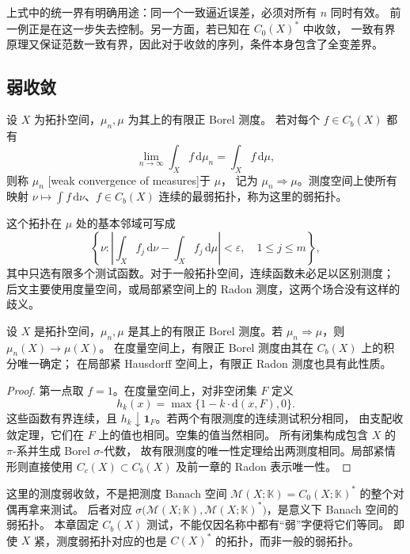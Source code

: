 上式中的统一界有明确用途：同一个一致逼近误差，必须对所有 \(n\) 同时有效。
前一例正是在这一步失去控制。另一方面，若已知在 \(C_0(X)^*\) 中\WeakStar{}收敛，
一致有界原理又保证范数一致有界，因此对于收敛的序列，\WeakStar{}条件本身包含了全变差界。

\subsection{弱收敛}
\label{b1:subsec:120103}

\begin{definition}\label{b1:def:measure-weak-convergence}
设 \(X\) 为拓扑空间，\(\mu_n,\mu\) 为其上的有限正 Borel 测度。
若对每个 \(f\in C_b(X)\) 都有
\[
 \lim_{n\to\infty}\int_X f\,\mathrm{d}\mu_n=\int_X f\,\mathrm{d}\mu,
\]
则称 \(\mu_n\) [weak convergence of measures]于 \(\mu\)，
记为 \(\mu_n\Rightarrow\mu\)。测度空间上使所有映射
\(\nu\mapsto\int f\,\mathrm{d}\nu\)、\(f\in C_b(X)\) 连续的最弱拓扑，称为这里的弱拓扑。
\end{definition}

这个拓扑在 \(\mu\) 处的基本邻域可写成
\[
 \left\{\nu:
 \left|\int_X f_j\,\mathrm{d}\nu-\int_X f_j\,\mathrm{d}\mu\right|<\varepsilon,
 \quad 1\leq j\leq m\right\},
\]
其中只选有限多个测试函数。对于一般拓扑空间，连续函数未必足以区别测度；
后文主要使用度量空间，或局部紧空间上的 Radon 测度，这两个场合没有这样的歧义。

\begin{proposition}\label{b1:prop:weak-mass-uniqueness}
设 \(X\) 是拓扑空间，\(\mu_n,\mu\) 是其上的有限正 Borel 测度。若 \(\mu_n\Rightarrow\mu\)，则 \(\mu_n(X)\to\mu(X)\)。
在度量空间上，有限正 Borel 测度由其在 \(C_b(X)\) 上的积分唯一确定；
在局部紧 Hausdorff 空间上，有限正 Radon 测度也具有此性质。
\end{proposition}
\begin{proof}
第一点取 \(f=1\)。在度量空间上，对非空闭集 \(F\) 定义
\[
 h_k(x)=\max\{1-k\cdot \mathrm{d}(x,F),0\}.
\]
这些函数有界连续，且 \(h_k\downarrow\mathbf1_F\)。若两个有限测度的连续测试积分相同，
由支配收敛定理，它们在 \(F\) 上的值也相同。空集的值当然相同。
所有闭集构成包含 \(X\) 的 \(\pi\)-系并生成 Borel \(\sigma\)-代数，
故有限测度的唯一性定理给出两测度相同。局部紧情形则直接使用
\(C_c(X)\subset C_b(X)\) 及前一章的 Radon 表示唯一性。
\end{proof}

这里的测度弱收敛，不是把测度 Banach 空间 \(\mathcal M(X;\mathbb K)=C_0(X;\mathbb K)^*\) 的整个对偶再拿来测试。
后者对应 \(\sigma\bigl(\mathcal M(X;\mathbb K),\mathcal M(X;\mathbb K)^*\bigr)\)，是意义下 Banach 空间的弱拓扑。
本章固定 \(C_b(X)\) 测试，不能仅因名称中都有“弱”字便将它们等同。
即使 \(X\) 紧，测度弱拓扑对应的也是 \(C(X)^*\) 的\WeakStar{}拓扑，而非一般的弱拓扑。

